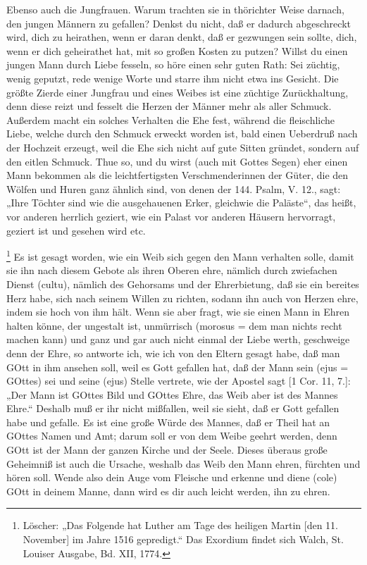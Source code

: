 Ebenso auch die Jungfrauen. Warum trachten sie in thörichter Weise darnach, den jungen Männern zu gefallen? Denkst du nicht, daß er dadurch abgeschreckt wird, dich zu heirathen, wenn er daran denkt, daß er gezwungen sein sollte, dich, wenn er dich geheirathet hat, mit so großen Kosten zu putzen? Willst du einen jungen Mann durch Liebe fesseln, so höre einen sehr guten Rath: Sei züchtig, wenig geputzt, rede wenige Worte und starre ihm nicht etwa ins Gesicht. Die größte Zierde einer Jungfrau und eines Weibes ist eine züchtige Zurückhaltung, denn diese reizt und fesselt die Herzen der Männer mehr als aller Schmuck. Außerdem macht ein solches Verhalten die Ehe fest, während die fleischliche Liebe, welche durch den Schmuck erweckt worden ist, bald einen Ueberdruß nach der Hochzeit erzeugt, weil die Ehe sich nicht auf gute Sitten gründet, sondern auf den eitlen Schmuck. Thue so, und du wirst (auch mit Gottes Segen)
eher einen Mann bekommen als die leichtfertigsten Verschmenderinnen der Güter, die den Wölfen und Huren ganz ähnlich sind, von denen der 144. Psalm, V. 12., sagt: „Ihre Töchter sind wie die ausgehauenen Erker, gleichwie die Paläste“, das heißt, vor anderen herrlich geziert, wie ein Palast vor anderen Häusern hervorragt, geziert ist und gesehen wird etc.

\footnote{Löscher: „Das Folgende hat Luther am Tage des heiligen Martin [den 11. November] im Jahre 1516 gepredigt.“ Das Exordium findet sich Walch, St. Louiser Ausgabe, Bd. XII, 1774.} Es ist gesagt worden, wie ein Weib sich gegen den Mann verhalten solle, damit sie ihn nach diesem Gebote als ihren Oberen ehre, nämlich durch zwiefachen Dienst (cultu), nämlich des Gehorsams und der Ehrerbietung, daß sie ein bereites Herz habe, sich nach seinem Willen zu richten, sodann ihn auch von Herzen ehre, indem sie hoch von ihm hält. Wenn sie aber fragt, wie sie einen Mann in Ehren halten könne, der ungestalt ist, unmürrisch (morosus = dem man nichts recht machen kann) und ganz und gar auch nicht einmal der Liebe werth, geschweige denn der Ehre, so antworte ich, wie ich von den Eltern gesagt habe, daß man GOtt in ihm ansehen soll, weil es Gott gefallen hat, daß der Mann sein (ejus = GOttes) sei und seine (ejus) Stelle vertrete, wie der Apostel sagt [1 Cor. 11, 7.]: „Der Mann ist GOttes Bild und GOttes Ehre, das Weib aber ist des Mannes Ehre.“ Deshalb muß er ihr nicht mißfallen, weil sie sieht, daß er Gott gefallen habe und gefalle. Es ist eine große Würde des Mannes, daß er Theil hat an GOttes Namen und Amt; darum soll er von dem Weibe geehrt werden, denn GOtt ist der Mann der ganzen Kirche und der Seele. Dieses überaus große Geheimniß ist auch die Ursache, weshalb das Weib den Mann ehren, fürchten und hören soll. Wende also dein Auge vom Fleische und erkenne und diene (cole) GOtt in deinem Manne, dann wird es dir auch leicht werden, ihn zu ehren.

